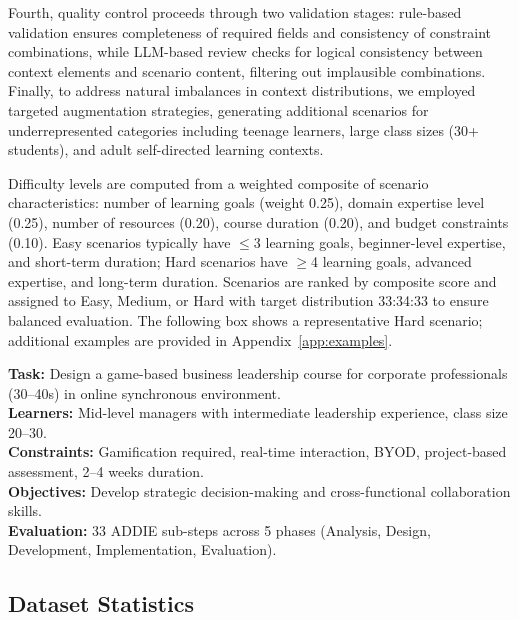 Fourth, quality control proceeds through two validation stages: rule-based validation ensures completeness of required fields and consistency of constraint combinations, while LLM-based review checks for logical consistency between context elements and scenario content, filtering out implausible combinations. Finally, to address natural imbalances in context distributions, we employed targeted augmentation strategies, generating additional scenarios for underrepresented categories including teenage learners, large class sizes (30+ students), and adult self-directed learning contexts.

Difficulty levels are computed from a weighted composite of scenario characteristics: number of learning goals (weight 0.25), domain expertise level (0.25), number of resources (0.20), course duration (0.20), and budget constraints (0.10). Easy scenarios typically have $\leq$3 learning goals, beginner-level expertise, and short-term duration; Hard scenarios have $\geq$4 learning goals, advanced expertise, and long-term duration. Scenarios are ranked by composite score and assigned to Easy, Medium, or Hard with target distribution 33:34:33 to ensure balanced evaluation. The following box shows a representative Hard scenario; additional examples are provided in Appendix~\ref{app:examples}.

\begin{tcolorbox}[colback=gray!5!white, colframe=gray!75!black, title=\small\textbf{Example Scenario (Hard)}]
\small
\textbf{Task:} Design a game-based business leadership course for corporate professionals (30--40s) in online synchronous environment. \\
\textbf{Learners:} Mid-level managers with intermediate leadership experience, class size 20--30. \\
\textbf{Constraints:} Gamification required, real-time interaction, BYOD, project-based assessment, 2--4 weeks duration. \\
\textbf{Objectives:} Develop strategic decision-making and cross-functional collaboration skills. \\
\textbf{Evaluation:} 33 ADDIE sub-steps across 5 phases (Analysis, Design, Development, Implementation, Evaluation).
\end{tcolorbox}

\subsection{Dataset Statistics}
\label{subsec:dataset-stats}

